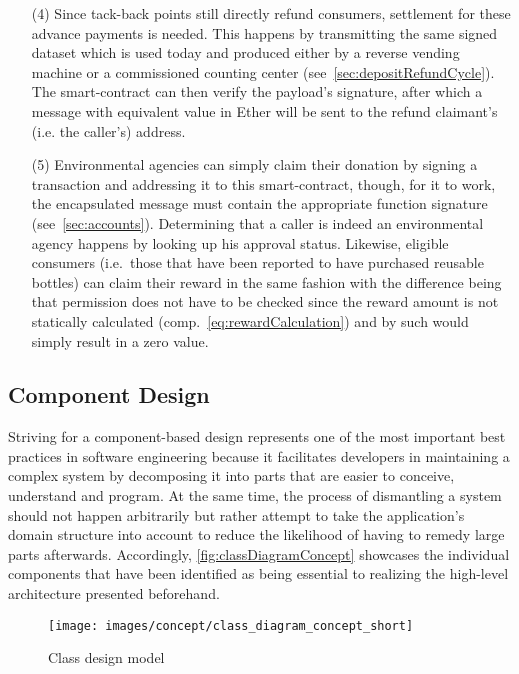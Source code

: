 \begin{itemize}
	\item [(4)] Since tack-back points still directly refund consumers, settlement for these advance payments is needed. This happens by transmitting the same signed dataset which is used today and produced either by a reverse vending machine or a commissioned counting center (see~\ref{sec:depositRefundCycle}). The smart-contract can then verify the payload's signature, after which a message with equivalent value in Ether will be sent to the refund claimant's (i.e. the caller's) address. 
	\item [(5)] Environmental agencies can simply claim their donation by signing a transaction and addressing it to this smart-contract, though, for it to work, the encapsulated message must contain the appropriate function signature (see~\ref{sec:accounts}). Determining that a caller is indeed an environmental agency happens by looking up his approval status. Likewise, eligible consumers (i.e.~those that have been reported to have purchased reusable bottles) can claim their reward in the same fashion with the difference being that permission does not have to be checked since the reward amount is not statically calculated (comp.~\autoref{eq:rewardCalculation}) and by such would simply result in a zero value.
\end{itemize}

\subsection{Component Design}
\label{sec:componentDesign}
Striving for a component-based design represents one of the most important best practices in software engineering because it facilitates developers in maintaining a complex system by decomposing it into parts that are easier to conceive, understand and program. At the same time, the process of dismantling a system should not happen arbitrarily but rather attempt to take the application's domain structure into account to reduce the likelihood of having to remedy large parts afterwards. Accordingly, \autoref{fig:classDiagramConcept} showcases the individual components that have been identified as being essential to realizing the high-level architecture presented beforehand.

\begin{figure}[hbt]
	  \texttt{[image: images/concept/class\_diagram\_concept\_short]}
	  \caption{Class design model}
	  \label{fig:classDiagramConcept}
\end{figure}

